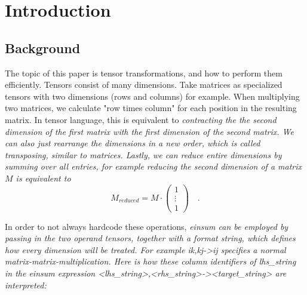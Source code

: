 \documentclass[sigconf]{acmart}
\renewcommand{\texttt}[1]{\begingroup\ttfamily\sloppy\hbadness=10000 #1\endgroup}
\begin{document}


\maketitle



\section{Introduction}
\subsection{Background}
The topic of this paper is tensor transformations, and how to perform them efficiently. Tensors consist of many dimensions. Take matrices as specialized tensors with two dimensions (rows and columns) for example. When multiplying two matrices, we calculate "row times column" for each position in the resulting matrix. In tensor language, this is equivalent to \em contracting \em the the second dimension of the first matrix with the first dimension of the second matrix. We can also just rearrange the dimensions in a new order, which is called  \em transposing\em , similar to matrices. Lastly, we can \em reduce \em entire dimensions by summing over all entries, for example reducing the second dimension of a matrix $M$ is equivalent to
\[ M_{reduced} = M \cdot \begin{pmatrix}
  1 \\
  \vdots \\
  1
\end{pmatrix} \quad . \]

\noindent
In order to not always hardcode these operations, \em einsum \em can be employed by passing in the two operand tensors, together with a format string, which defines how every dimension will be treated. For example \texttt{ik,kj->ij} specifies a normal matrix-matrix-multiplication. Here is how these \em column identifiers \em of \texttt{lhs\_string} in the einsum expression \texttt{<lhs\_string>,<rhs\_string>-><target\_string>} are interpreted:
\end{document}
